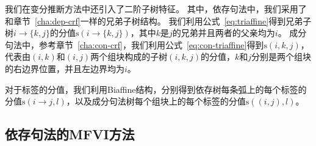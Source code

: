 我们在变分推断方法中还引入了二阶子树特征。
其中，依存句法中，我们采用了和章节~\ref{cha:dep-crf}一样的兄弟子树结构。
我们利用公式~\ref{eq:triaffine}得到兄弟子树$i\rightarrow \{k,j\}$的分值$\mathrm{s}(i\rightarrow\{k,j\})$，其中$k$是$j$的兄弟并且两者的父亲均为$i$。
成分句法中，参考章节~\ref{cha:con-crf}，我们利用公式~\ref{eq:con-triaffine}得到$\mathrm{s}(i,k,j)$，代表由$(i,k)$和$(i,j)$两个组块构成的子树$(i,k,j)$的分值，$k$和$j$分别是两个组块的右边界位置，并且左边界均为$i$。

对于标签的分值，我们利用Biaffine结构，分别得到依存树每条弧上的每个标签的分值$\mathrm{s}(i\rightarrow j,l)$，以及成分句法树每个组块上的每个标签的分值$\mathrm{s}((i,j),l)$。

\subsection{依存句法的MFVI方法}\label{sec:dep-vi}

